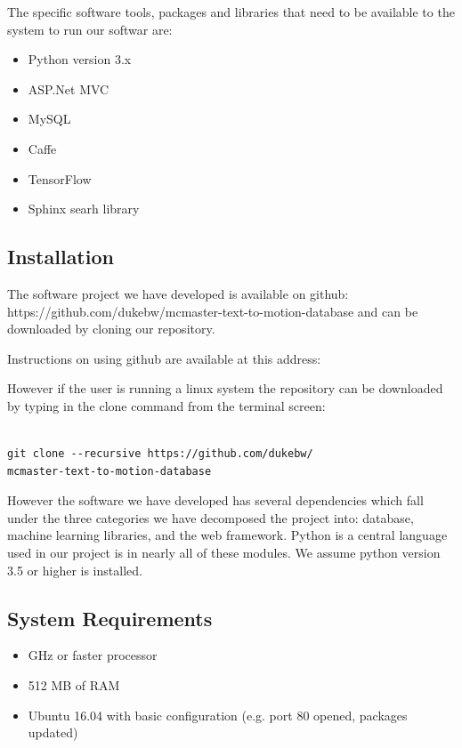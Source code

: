 \documentclass{scrreprt}
\begin{document}
The specific software tools, packages and libraries that need to be available to the system to run our softwar are:

\begin{itemize}
  \item Python version 3.x
  \item ASP.Net MVC
  \item MySQL
  \item Caffe
  \item TensorFlow
  \item Sphinx searh library
\end{itemize}



\subsection{Installation}
The software project we have developed is available on github: https://github.com/dukebw/mcmaster-text-to-motion-database and can be downloaded by cloning our repository.

Instructions on using github are available at this address:

However if the user is running a linux system the repository can be downloaded by typing in the clone command from the terminal screen:
\begin{lstlisting}

git clone --recursive https://github.com/dukebw/
mcmaster-text-to-motion-database

\end{lstlisting}

However the software we have developed has several dependencies which fall under the three categories we have decomposed the project into: database, machine learning libraries, and the web framework.  Python is a central language used in our project is in nearly all of these modules.  We assume python version 3.5 or higher is installed.


\subsection{System Requirements}

\begin{itemize}
\item GHz or faster processor
\item 512 MB of RAM
\item Ubuntu 16.04 with basic configuration (e.g. port 80 opened, packages updated)
\end{itemize}
\end{document}
